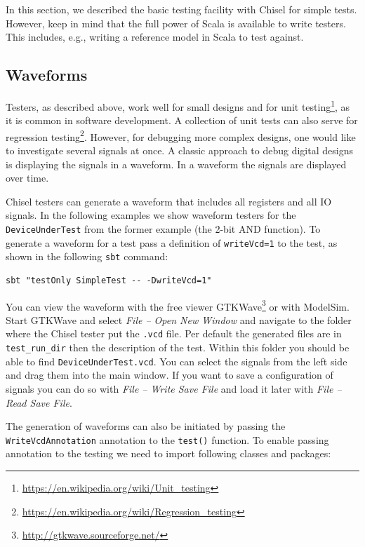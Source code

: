 \documentclass[%
    10pt,
    headinclude, footexclude,
    openright, %
    notitlepage,
    cleardoubleempty,
    headsepline,
    pointlessnumbers,
    bibtotoc, idxtotoc,
    ]{scrbook}
\newcommand{\code}[1]{{\small{\texttt{#1}}}}
\newcommand{\myref}[2]{\href{#1}{#2}}
\renewcommand{\myref}[2]{{#2}{\footnote{\url{#1}}}}
\begin{document}
In this section, we described the basic testing facility with Chisel for simple tests.
However, keep in mind that the full power of Scala is available to write testers.
This includes, e.g., writing a reference model in Scala to test against.

\subsection{Waveforms}



Testers, as described above, work well for small designs and for 
\myref{https://en.wikipedia.org/wiki/Unit_testing}{unit testing}, as it is common in
software development. A collection of unit tests can also serve for
\myref{https://en.wikipedia.org/wiki/Regression_testing}{regression testing}. However, 
for debugging more complex designs, one would like to investigate several signals at 
once. A classic approach to debug digital designs is displaying the signals in a 
waveform. In a waveform the signals are displayed over time.

\noindent Chisel testers can generate a waveform that includes all registers and all 
IO signals. In the following examples we show waveform testers for the 
\code{DeviceUnderTest} from the former example (the 2-bit AND function).
To generate a waveform for a test pass a definition of \code{writeVcd=1} to
the test, as shown in the following \code{sbt} command:

\begin{verbatim}
sbt "testOnly SimpleTest -- -DwriteVcd=1"
\end{verbatim}

You can view the waveform with the free viewer
\myref{http://gtkwave.sourceforge.net/}{GTKWave} or with ModelSim.
Start GTKWave and select \emph{File -- Open New Window} and navigate to the
folder where the Chisel tester put the \code{.vcd} file. Per default the generated files
are in \code{test\_run\_dir} then the description of the test.
Within this folder you should be able to find \code{DeviceUnderTest.vcd}.
You can select the signals from the left side and drag them into the main window.
If you want to save a configuration of signals you can do so with \emph{File -- Write Save File}
and load it later with \emph{File -- Read Save File}. 

The generation of waveforms can also be initiated by passing the \code{WriteVcdAnnotation}
annotation to the \code{test()} function.
To enable passing annotation to the testing we need to import following classes and packages:
\end{document}
